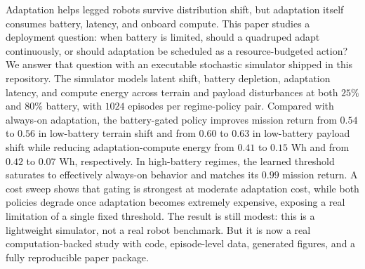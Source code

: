 Adaptation helps legged robots survive distribution shift, but adaptation itself consumes battery, latency, and onboard compute. This paper studies a deployment question: when battery is limited, should a quadruped adapt continuously, or should adaptation be scheduled as a resource-budgeted action? We answer that question with an executable stochastic simulator shipped in this repository. The simulator models latent shift, battery depletion, adaptation latency, and compute energy across terrain and payload disturbances at both $25\%$ and $80\%$ battery, with $1024$ episodes per regime-policy pair. Compared with always-on adaptation, the battery-gated policy improves mission return from $0.54$ to $0.56$ in low-battery terrain shift and from $0.60$ to $0.63$ in low-battery payload shift while reducing adaptation-compute energy from $0.41$ to $0.15$ Wh and from $0.42$ to $0.07$ Wh, respectively. In high-battery regimes, the learned threshold saturates to effectively always-on behavior and matches its $0.99$ mission return. A cost sweep shows that gating is strongest at moderate adaptation cost, while both policies degrade once adaptation becomes extremely expensive, exposing a real limitation of a single fixed threshold. The result is still modest: this is a lightweight simulator, not a real robot benchmark. But it is now a real computation-backed study with code, episode-level data, generated figures, and a fully reproducible paper package.
